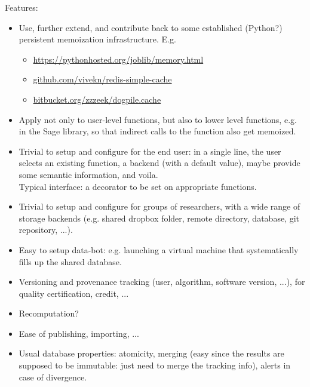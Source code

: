 \begin{Workpackage}{\thewpno}
\begin{WPDeliverables}
\begin{itemize}
  Features:
  \begin{itemize}
  \item Use, further extend, and contribute back to some established
    (Python?) persistent memoization infrastructure. E.g.
    \begin{itemize}
    \item \url{https://pythonhosted.org/joblib/memory.html}
    \item \url{github.com/vivekn/redis-simple-cache}
    \item \url{bitbucket.org/zzzeek/dogpile.cache}
    \end{itemize}
  \item Apply not only to user-level functions, but also to lower
    level functions, e.g. in the Sage library, so that indirect calls
    to the function also get memoized.
  \item Trivial to setup and configure for the end user: in a single
    line, the user selects an existing function, a backend (with a
    default value), maybe provide some semantic information, and
    voila. \\
    Typical interface: a decorator to be set on appropriate functions.
  \item Trivial to setup and configure for groups of researchers, with
    a wide range of storage backends (e.g. shared dropbox folder,
    remote directory, database, git repository, ...).
  \item Easy to setup data-bot: e.g. launching a virtual machine that
    systematically fills up the shared database.
  \item Versioning and provenance tracking (user, algorithm, software
    version, ...), for quality certification, credit, ...
  \item Recomputation?
  \item Ease of publishing, importing, ...
  \item Usual database properties: atomicity, merging (easy since the
    results are supposed to be immutable: just need to merge the
    tracking info), alerts in case of divergence.
  \end{itemize}
\end{itemize}
\end{WPDeliverables}
\end{Workpackage}
